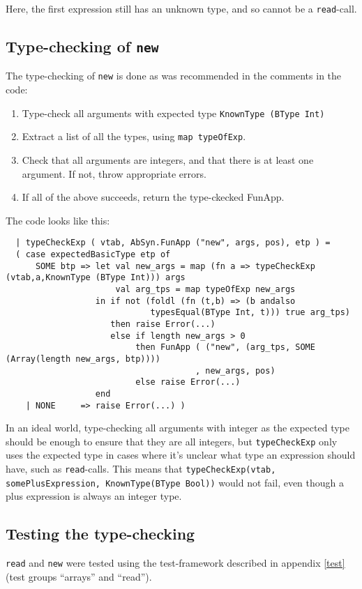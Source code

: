 \documentclass{article}
\begin{document}
Here, the first expression still has an unknown type, and so cannot be a \texttt{read}-call.

\subsection{Type-checking of \texttt{new}}
The type-checking of \texttt{new} is done as was recommended in the comments in the code:

\begin{enumerate}
    \item Type-check all arguments with expected type \texttt{KnownType (BType Int)}
    \item Extract a list of all the types, using \texttt{map typeOfExp}.
    \item Check that all arguments are integers, and that there is at least one argument. If not, throw appropriate errors.
    \item If all of the above succeeds, return the type-ckecked FunApp.
\end{enumerate}

The code looks like this:
\begin{lstlisting}
  | typeCheckExp ( vtab, AbSyn.FunApp ("new", args, pos), etp ) =
  ( case expectedBasicType etp of
      SOME btp => let val new_args = map (fn a => typeCheckExp (vtab,a,KnownType (BType Int))) args
                      val arg_tps = map typeOfExp new_args
                  in if not (foldl (fn (t,b) => (b andalso
                             typesEqual(BType Int, t))) true arg_tps)
                     then raise Error(...)
                     else if length new_args > 0
                          then FunApp ( ("new", (arg_tps, SOME (Array(length new_args, btp))))
                                      , new_args, pos)
                          else raise Error(...)
                  end
    | NONE     => raise Error(...) )
\end{lstlisting}

In an ideal world, type-checking all arguments with integer as the expected type should be enough to ensure that they are all integers, but \texttt{typeCheckExp} only uses the expected type in cases where it's unclear what type an expression should have, such as \texttt{read}-calls. This means that \texttt{typeCheckExp(vtab, somePlusExpression, KnownType(BType Bool))} would not fail, even though a plus expression is always an integer type.

\subsection{Testing the type-checking}
\texttt{read} and \texttt{new} were tested using the test-framework described in appendix \ref{test} (test groups ``arrays'' and ``read'').
\end{document}
